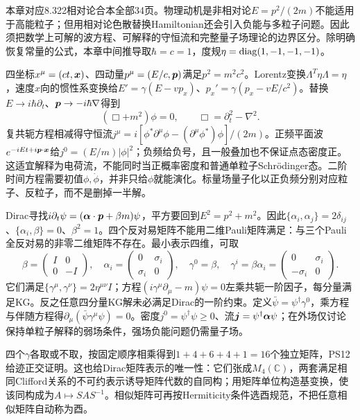 本章对应8.322相对论合本全部34页。物理动机是非相对论$E=p^2/(2m)$不能适用于高能粒子；但用相对论色散替换Hamiltonian还会引入负能与多粒子问题。因此须把数学上可解的波方程、可解释的守恒流和完整量子场理论的边界区分。除明确恢复常量的公式，本章中间推导取$\hbar=c=1$，度规$\eta=\operatorname{diag}(1,-1,-1,-1)$。

四坐标$x^\mu=(ct,\boldsymbol{x})$、四动量$p^\mu=(E/c,\boldsymbol{p})$满足$p^2=m^2c^2$。Lorentz变换$\Lambda^T\eta\Lambda=\eta$，速度$x$向的惯性系变换给$E'=\gamma(E-vp_x)$、$p_x'=\gamma(p_x-vE/c^2)$。替换$E\to i\hbar\partial_t$、$\boldsymbol{p}\to-i\hbar\nabla$得到
\[
 (\Box+m^2)\phi=0,\qquad
 \Box=\partial_t^2-\nabla^2.
\]
复共轭方程相减得守恒流$j^\mu=i[\phi^*\partial^\mu\phi-(\partial^\mu\phi^*)\phi]/(2m)$。正频平面波$e^{-iEt+i\boldsymbol{p}\cdot\boldsymbol{x}}$给$j^0=(E/m)|\phi|^2$；负频给负号，且一般叠加也不保证点态密度正。这适宜解释为电荷流，不能同时当正概率密度和普通单粒子Schrödinger态。二阶时间方程需要初值$\phi,\dot\phi$，并非只给$\phi$就能演化。标量场量子化以正负频分别对应粒子、反粒子，而不是删掉一半解。

Dirac寻找$i\partial_t\psi=(\boldsymbol{\alpha}\cdot\boldsymbol{p}+\beta m)\psi$，平方要回到$E^2=p^2+m^2$。因此$\{\alpha_i,\alpha_j\}=2\delta_{ij}$、$\{\alpha_i,\beta\}=0$、$\beta^2=1$。四个反对易矩阵不能用二维Pauli矩阵满足：与三个Pauli全反对易的非零二维矩阵不存在。最小表示四维，可取
\[
 \beta=\begin{pmatrix}I&0\\0&-I\end{pmatrix},\quad
 \alpha_i=\begin{pmatrix}0&\sigma_i\\\sigma_i&0\end{pmatrix},\quad
 \gamma^0=\beta,\quad
 \gamma^i=\beta\alpha_i=\begin{pmatrix}0&\sigma_i\\-\sigma_i&0\end{pmatrix}.
\]
它们满足$\{\gamma^\mu,\gamma^\nu\}=2\eta^{\mu\nu}I$；方程$(i\gamma^\mu\partial_\mu-m)\psi=0$左乘共轭一阶因子，每分量满足KG。反之任意四分量KG解未必满足Dirac的一阶约束。定义$\bar\psi=\psi^\dagger\gamma^0$，乘方程与伴随方程得$\partial_\mu(\bar\psi\gamma^\mu\psi)=0$。密度$j^0=\psi^\dagger\psi\ge0$、流$\boldsymbol{j}=\psi^\dagger\boldsymbol{\alpha}\psi$；在外场仅讨论保持单粒子解释的弱场条件，强场负能问题仍需量子场。

四个$\gamma$各取或不取，按固定顺序相乘得到$1+4+6+4+1=16$个独立矩阵，PS12给迹正交证明。这也给Dirac矩阵表示的唯一性：它们张成$M_4(\mathbb C)$，两套满足相同Clifford关系的不可约表示诱导矩阵代数的自同构；用矩阵单位构造基变换，使该同构成为$A\mapsto SAS^{-1}$。相似矩阵可再按Hermiticity条件选酉规范，不把任意相似矩阵自动称为酉。

